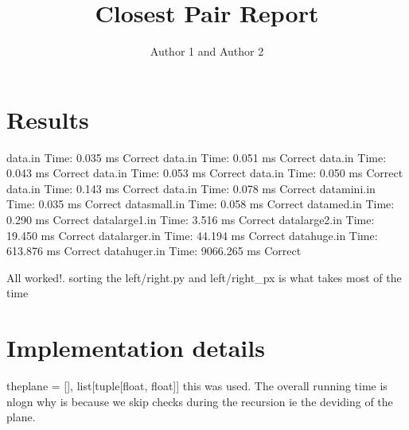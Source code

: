 \documentclass{article}
\title{Closest Pair Report}
\author{Author 1 and Author 2}
\begin{document}
  \maketitle

  \section{Results}
data\sample\1.in
Time: 0.035 ms
Correct
data\sample\2.in
Time: 0.051 ms
Correct
data\more\1.in
Time: 0.043 ms
Correct
data\more\2.in
Time: 0.053 ms
Correct
data\more\3.in
Time: 0.050 ms
Correct
data\more\4.in
Time: 0.143 ms
Correct
data\more\5.in
Time: 0.078 ms
Correct
data\secret\0mini.in
Time: 0.035 ms
Correct
data\secret\1small.in
Time: 0.058 ms
Correct
data\secret\2med.in
Time: 0.290 ms
Correct
data\secret\3large1.in
Time: 3.516 ms
Correct
data\secret\4large2.in
Time: 19.450 ms
Correct
data\secret\5larger.in
Time: 44.194 ms
Correct
data\secret\6huge.in
Time: 613.876 ms
Correct
data\secret\7huger.in
Time: 9066.265 ms
Correct

  All worked!. sorting the left/right.py and left/right_px is what takes most of the time
  \section{Implementation details}

  theplane = [], list[tuple[float, float]] this was used. The overall running time is nlogn why is because we skip checks during the recursion ie the deviding of the plane. 
\end{document}
